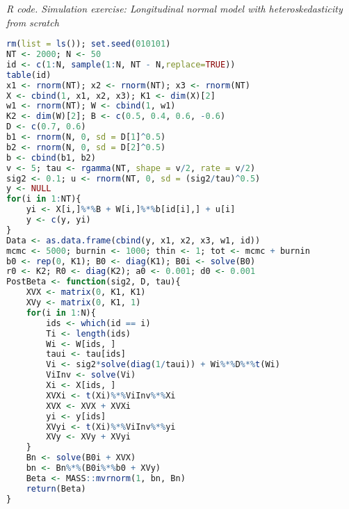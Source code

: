 \begin{tcolorbox}[enhanced,width=4.67in,center upper,
	fontupper=\large\bfseries,drop shadow southwest,sharp corners]
	\textit{R code. Simulation exercise: Longitudinal normal model with heteroskedasticity from scratch}
	\begin{VF}
		\begin{lstlisting}[language=R]
rm(list = ls()); set.seed(010101)
NT <- 2000; N <- 50
id <- c(1:N, sample(1:N, NT - N,replace=TRUE))
table(id)
x1 <- rnorm(NT); x2 <- rnorm(NT); x3 <- rnorm(NT) 
X <- cbind(1, x1, x2, x3); K1 <- dim(X)[2]
w1 <- rnorm(NT); W <- cbind(1, w1)
K2 <- dim(W)[2]; B <- c(0.5, 0.4, 0.6, -0.6)
D <- c(0.7, 0.6)
b1 <- rnorm(N, 0, sd = D[1]^0.5)
b2 <- rnorm(N, 0, sd = D[2]^0.5)
b <- cbind(b1, b2)
v <- 5; tau <- rgamma(NT, shape = v/2, rate = v/2)
sig2 <- 0.1; u <- rnorm(NT, 0, sd = (sig2/tau)^0.5)
y <- NULL
for(i in 1:NT){
	yi <- X[i,]%*%B + W[i,]%*%b[id[i],] + u[i] 
	y <- c(y, yi)
}
Data <- as.data.frame(cbind(y, x1, x2, x3, w1, id))
mcmc <- 5000; burnin <- 1000; thin <- 1; tot <- mcmc + burnin
b0 <- rep(0, K1); B0 <- diag(K1); B0i <- solve(B0) 
r0 <- K2; R0 <- diag(K2); a0 <- 0.001; d0 <- 0.001
PostBeta <- function(sig2, D, tau){
	XVX <- matrix(0, K1, K1)
	XVy <- matrix(0, K1, 1)
	for(i in 1:N){
		ids <- which(id == i)
		Ti <- length(ids)
		Wi <- W[ids, ]
		taui <- tau[ids]
		Vi <- sig2*solve(diag(1/taui)) + Wi%*%D%*%t(Wi)
		ViInv <- solve(Vi)
		Xi <- X[ids, ]
		XVXi <- t(Xi)%*%ViInv%*%Xi
		XVX <- XVX + XVXi
		yi <- y[ids]
		XVyi <- t(Xi)%*%ViInv%*%yi
		XVy <- XVy + XVyi
	}
	Bn <- solve(B0i + XVX)
	bn <- Bn%*%(B0i%*%b0 + XVy)
	Beta <- MASS::mvrnorm(1, bn, Bn)
	return(Beta)
}\end{lstlisting}
	\end{VF}
\end{tcolorbox}


